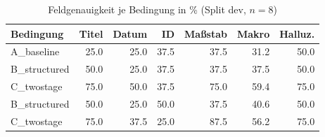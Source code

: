 \begin{table}[htb]
\centering
\caption{Feldgenauigkeit je Bedingung in \% (Split dev, $n=8$)}
\label{tab:results}
\begin{tabular}{lrrrrrr}
\toprule
Bedingung & Titel & Datum & ID & Maßstab & Makro & Halluz. \\
\midrule
A\_baseline & 25.0 & 25.0 & 37.5 & 37.5 & 31.2 & 50.0 \\
B\_structured & 50.0 & 25.0 & 37.5 & 37.5 & 37.5 & 50.0 \\
C\_twostage & 75.0 & 50.0 & 37.5 & 75.0 & 59.4 & 75.0 \\
B\_structured & 50.0 & 25.0 & 50.0 & 37.5 & 40.6 & 50.0 \\
C\_twostage & 75.0 & 37.5 & 25.0 & 87.5 & 56.2 & 75.0 \\
\bottomrule
\end{tabular}
\end{table}
